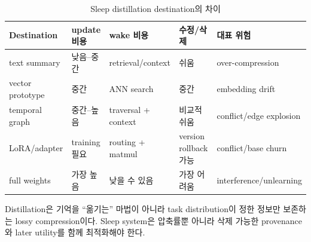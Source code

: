 \begin{table}[htbp]
\centering
\caption{Sleep distillation destination의 차이}
\label{tab:bg-distillation-destinations}
\begin{tabularx}{\textwidth}{L{0.19\textwidth}YYYY}
\toprule
Destination & update 비용 & wake 비용 & 수정/삭제 & 대표 위험 \\
\midrule
text summary & 낮음--중간 & retrieval/context & 쉬움 & over-compression \\
vector prototype & 중간 & ANN search & 중간 & embedding drift \\
temporal graph & 중간--높음 & traversal + context & 비교적 쉬움 & conflict/edge explosion \\
LoRA/adapter & training 필요 & routing + matmul & version rollback 가능 & conflict/base churn \\
full weights & 가장 높음 & 낮을 수 있음 & 가장 어려움 & interference/unlearning \\
\bottomrule
\end{tabularx}
\end{table}

\begin{keypoint}
Distillation은 기억을 ``옮기는'' 마법이 아니라 task distribution이 정한 정보만 보존하는
lossy compression이다. Sleep system은 압축률뿐 아니라 삭제 가능한 provenance와 later
utility를 함께 최적화해야 한다.
\end{keypoint}
